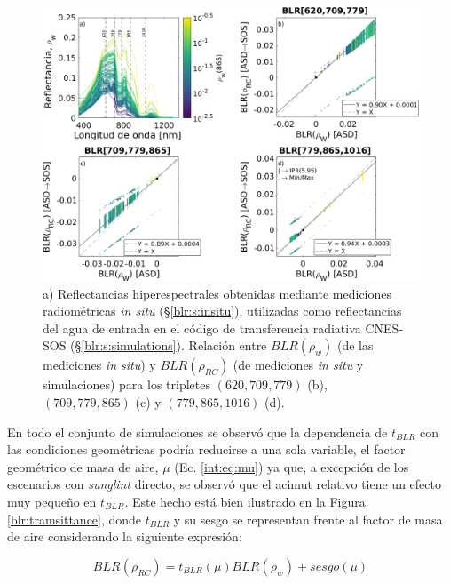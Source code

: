         \begin{figure}
        \centering
        \includegraphics[width=\textwidth]{blr/figures/blrRcSosVsblrWAsd}
        \caption[Comparación entre BLRs de reflectancias del agua medidas y de reflectancias RC simuladas]{a) Reflectancias hiperespectrales obtenidas mediante mediciones radiométricas \textit{in situ} (\S \ref{blr:s:insitu}), utilizadas como reflectancias del agua de entrada en el código de transferencia radiativa CNES-SOS (\S \ref{blr:s:simulations}). Relación entre $BLR(\rho_{w})$ (de las mediciones \textit{in situ}) y $BLR(\rho_{RC})$ (de mediciones \textit{in situ} y simulaciones) para los tripletes $(620,709,779)$ (b), $(709,779,865)$ (c) y $(779,865,1016)$ (d).}
        \label{blr:blrRcSosVsblrWAsd}
        \end{figure}
        
        En todo el conjunto de simulaciones se observó que la dependencia de $t_{BLR}$ con las condiciones geométricas podría reducirse a una sola variable, el factor geométrico de masa de aire, $\mu$ (Ec. \ref{int:eq:mu}) ya que, a excepción de los escenarios con \textit{sunglint} directo, se observó que el acimut relativo tiene un efecto muy pequeño en $t_{BLR}$. Este hecho está bien ilustrado en la Figura \ref{blr:tramsittance}, donde $t_{BLR}$ y su sesgo se representan frente al factor de masa de aire considerando la siguiente expresión:
        
        \begin{equation}
            BLR(\rho_{RC}) = t_{BLR}(\mu)BLR(\rho_{w}) + sesgo(\mu)
            \label{blr:eq:blrtmufactor}
        \end{equation}
        

